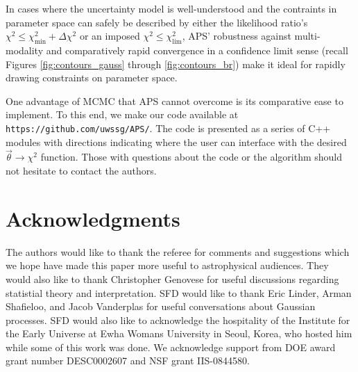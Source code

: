 \documentclass[useAMS,usenatbib]{aastex}
\begin{document}
In cases where the uncertainty model is well-understood and the contraints in
parameter space can safely be described by either the likelihood ratio's
$\chi^2\le\chi^2_\text{min}+\Delta\chi^2$ or an imposed
$\chi^2\le\chi^2_\text{lim}$, APS' robustness against multi-modality and
comparatively rapid convergence in a confidence limit sense (recall Figures
\ref{fig:contours_gauss} through \ref{fig:contours_br}) make it ideal for rapidly
drawing constraints on parameter space.

One advantage of MCMC that APS cannot overcome is its comparative ease to
implement.  To this end,
we make our code available at \verb|https://github.com/uwssg/APS/|.  
The code is presented as a series of C++ modules with directions
indicating where the user can interface with 
the desired $\vec{\theta}\rightarrow\chi^2$ function.  
Those with questions about the code or the algorithm should not
hesitate to contact the authors.


\section*{Acknowledgments}
The authors would like to thank the referee for comments and suggestions
which we hope have made this paper more useful to astrophysical audiences.
They would also like to thank Christopher Genovese for useful discussions
regarding statistial theory and interpretation.
SFD would like to thank Eric Linder, Arman Shafieloo, and Jacob Vanderplas 
for useful conversations
about Gaussian processes.  SFD would also like to acknowledge the hospitality of
the Institute for the Early Universe at Ewha Womans University in 
Seoul, Korea, who
hosted him while some of this work was done.
We acknowledge support from DOE award grant number DESC0002607 and NSF grant
IIS-0844580.
\end{document}

